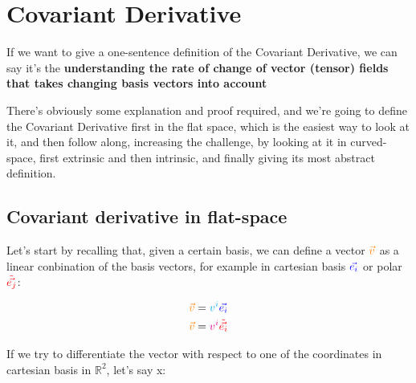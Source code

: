 \section{Covariant Derivative}

If we want to give a one-sentence definition of the  Covariant Derivative, we can
say it's the \textbf{understanding the rate of change of vector (tensor) fields
that takes changing basis vectors into account}

There's obviously some explanation and proof required, and we're going to define the 
Covariant Derivative first in the flat space, which is the easiest way to look at it, 
and then follow along, increasing the challenge, by looking at it in curved-space, first extrinsic and 
then intrinsic, and finally giving its most abstract definition.\\

\subsection{Covariant derivative in flat-space}

Let's start by recalling that, given a certain basis, we can define a vector $\color{orange}\vec{v}$ as a 
linear conbination of the basis vectors, for example in cartesian basis $\color{blue}\vec{e_i}$ or polar $\color{red}\tilde{\vec{e_j}}$:

\begin{align*}
    \begingroup\color{orange}\vec{v}\endgroup = \begingroup\color{cyan}v^i\endgroup \begingroup\color{blue}\vec{e_i}\endgroup\\
    \begingroup\color{orange}\vec{v}\endgroup = \begingroup\color{magenta}v^i\endgroup \begingroup\color{red}\tilde{\vec{e_i}}\endgroup
\end{align*}

If we try to differentiate the vector with respect to one of the coordinates in cartesian basis in $\mathbb{R}^2$, let's say x:


